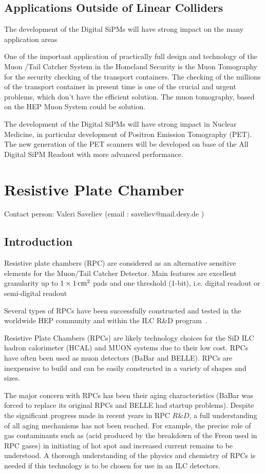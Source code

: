 \subsection{Applications Outside of Linear Colliders}
The development of the Digital SiPMs will have strong impact on the many application areas

One of the important application of practically full design and technology of the Muon /Tail Catcher System in the Homeland Security is the Muon Tomography for the security checking of the transport containers. The checking of the millions of the transport container in present time is one of the crucial and urgent problems, which don't have the efficient solution. The muon tomography, based on the HEP Muon System could be solution.

The development of the Digital SiPMs will have strong impact in Nuclear Medicine, in particular development of  Positron Emission Tomography (PET).  The new generation of the PET scanners will be developed on base of the All Digital SiPM Readout with more advanced performance.

\section{Resistive Plate Chamber }
Contact person: Valeri Saveliev (email : saveliev@mail.desy.de )

\subsection{Introduction}

Resistive plate chambers (RPC) are considered as an alternative sensitive elements for the Muon/Tail Catcher Detector.
Main features are excellent granularity up to $1\times\unit[1]{cm^2}$ pads and one threshold (1-bit), i.e. digital readout or semi-digital readout

Several types of RPCs have been successfully constructed and tested in the worldwide HEP community and within the ILC R\&D program~\cite{}.

Resistive Plate Chambers (RPCs) are likely technology choices for the SiD ILC hadron calorimeter (HCAL) and MUON systems due to their low cost.
RPCs have often been used as muon detectors (BaBar and BELLE). RPCs are inexpensive to build and can be easily constructed in a variety of shapes and sizes.

The major concern with RPCs has been their aging characteristics (BaBar was forced to replace its original RPCs and BELLE had startup problems).
Despite the significant progress made in recent years in RPC $R\&D$, a full understanding of all aging mechanisms has not been reached.
For example, the precise role of gas contaminants such as  (acid produced by the breakdown of the Freon used in RPC gases) in initiating of hot spot and increased current remains to be understood. A thorough understanding of the physics and chemistry of RPCs is needed if this technology is to be chosen for use in an ILC detectors.

